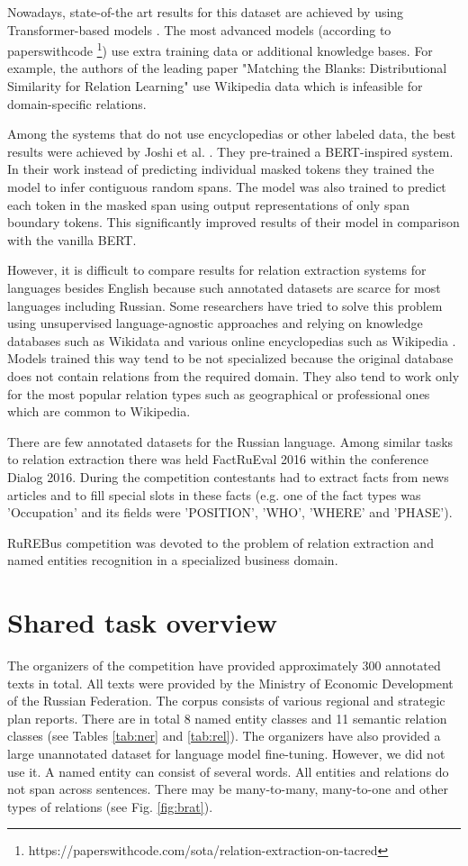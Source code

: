 \documentclass{dialogue}
\begin{document}
	Nowadays, state-of-the art results for this dataset are achieved by using Transformer-based models \cite{attention}. The most advanced models (according to paperswithcode \footnote{https://paperswithcode.com/sota/relation-extraction-on-tacred}) use extra training data or additional knowledge bases. For example, the authors of the leading paper "Matching the Blanks: Distributional Similarity for Relation Learning" \cite{BaldiniSoares2019} use Wikipedia data which is infeasible for domain-specific relations.
	
	Among the systems that do not use encyclopedias or other labeled data, the best results were achieved by Joshi et al. \cite{spanbert}. They pre-trained a BERT-inspired system. In their work instead of predicting individual masked tokens they trained the model to infer contiguous random  spans. The model was also trained to predict each token in the masked span using output representations of only span boundary tokens. This significantly improved results of their model in comparison with the vanilla BERT.
	
	However, it is difficult to compare results for relation extraction systems for languages besides English because such annotated datasets are scarce for most languages including Russian. Some researchers have tried to solve this problem using unsupervised language-agnostic approaches and relying on knowledge databases such as Wikidata and various online encyclopedias such as Wikipedia \cite{Heist2017}. Models trained this way tend to be not specialized because the original database does not contain relations from the required domain. They also tend to work only for the most popular relation types such as geographical or professional ones which are common to Wikipedia.
	
	There are few annotated datasets for the Russian language. Among similar tasks to relation extraction there was held FactRuEval 2016 within the conference Dialog 2016. During the competition contestants had to extract facts from news articles and to fill special slots in these facts (e.g. one of the fact types was 'Occupation' and its fields were 'POSITION', 'WHO', 'WHERE' and 'PHASE').
	
	RuREBus competition was devoted to the problem of relation extraction and named entities recognition in a specialized business domain.
	
	\section{Shared task overview}
	The organizers of the competition have provided approximately 300 annotated texts in total. All texts were provided by the Ministry of Economic Development of the Russian Federation. The corpus consists of various regional and strategic plan reports. There are in total 8 named entity classes and 11 semantic relation classes (see Tables \ref{tab:ner} and \ref{tab:rel}). The organizers have also provided a large unannotated dataset for language model fine-tuning. However, we did not use it. A named entity can consist of several words. All entities and relations do not span across sentences. There may be many-to-many, many-to-one and other types of relations (see Fig. \ref{fig:brat}).
	
\end{document}
